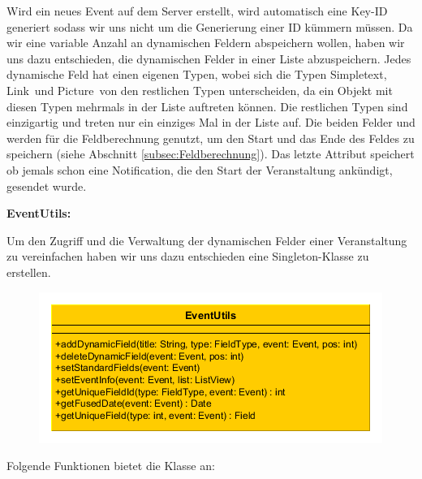 Wird ein neues Event auf dem Server erstellt, wird automatisch eine Key-ID generiert sodass wir uns nicht um die Generierung einer ID kümmern müssen. Da wir eine variable Anzahl an dynamischen Feldern abspeichern wollen, haben wir uns dazu entschieden, die dynamischen Felder in einer Liste abzuspeichern. Jedes dynamische Feld hat einen eigenen Typen, wobei sich die Typen \glqq Simpletext\grqq, \glqq Link\grqq\ und \glqq Picture\grqq\ von den restlichen Typen unterscheiden, da ein Objekt mit diesen Typen mehrmals in der Liste auftreten können. Die restlichen Typen sind einzigartig und treten nur ein einziges Mal in der Liste auf. Die beiden Felder  und  werden für die Feldberechnung genutzt, um den Start und  das Ende des Feldes zu speichern
(siehe Abschnitt \ref{subsec:Feldberechnung}). Das letzte Attribut  speichert ob jemals schon eine Notification, die den Start der Veranstaltung ankündigt, gesendet wurde.

\textbf{EventUtils:}

Um den Zugriff und die Verwaltung der dynamischen Felder einer Veranstaltung zu vereinfachen haben wir uns dazu entschieden eine Singleton-Klasse  zu erstellen.

\begin{figure}[htb]
\centering
\includegraphics[width=\textwidth]{graphics/EventUtils_long.png}
\label{fig:eventutils}
\end{figure}

Folgende Funktionen bietet die Klasse  an:

